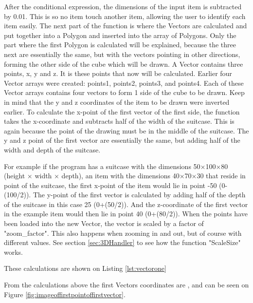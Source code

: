 After the conditional expression, the dimensions of the input item is subtracted by 0.01. This is so no item touch another item, allowing the user to identify each item easily. 
The next part of the function is where the Vectors are calculated and put together into a Polygon and inserted into the array of Polygons. Only the part where the first Polygon is calculated will be explained, because the three next are essentially the same, but with the vectors pointing in other directions, forming the other side of the cube which will be drawn.
A Vector contains three points, x, y and z. It is these points that now will be calculated. Earlier four Vector arrays were created: points1, points2, points3, and points4. Each of these Vector arrays contains four vectors to form 1 side of the cube to be drawn. 
Keep in mind that the y and z coordinates of the item to be drawn were inverted earlier. 
To calculate the x-point of the first vector of the first side, the function takes the x-coordinate and subtracts half of the width of the suitcase. This is again because the  point of the drawing must be in the middle of the suitcase. The y and z point of the first vector are essentially the same, but adding half of the width and depth of the suitcase.

For example if the program has a suitcase with the dimensions 50×100×80 (height × width × depth), an item with the dimensions 40×70×30 that reside in point  of the suitcase, the first x-point of the item would lie in point -50 (0-(100/2)). 
The y-point of the first vector is calculated by adding half of the depth of the suitcase in this case 25 (0+(50/2)). And the z-coordinate of the first vector in the example item would then lie in point 40 (0+(80/2)).
When the points have been loaded into the new Vector, the vector is scaled by a factor of "zoom\_factor". This also happens when zooming in and out, but of course with different values. See section \ref{sec:3DHandler} to see how the function "ScaleSize" works. 

These calculations are shown on Listing \ref{lst:vectorone}


From the calculations above the first Vectors coordinates are , and can be seen on Figure  \ref{fig:imageoffirstpointoffirstvector}.


